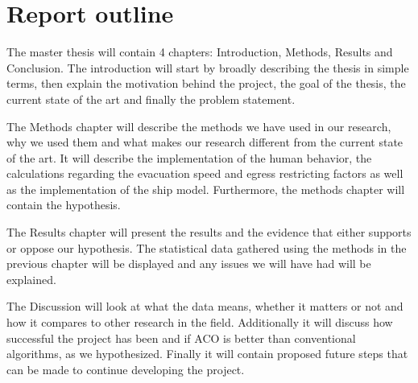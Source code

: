 \section{Report outline}

The master thesis will contain 4 chapters: Introduction, Methods, Results and Conclusion.                %
The introduction will start by broadly describing the thesis in simple terms, then explain the motivation behind the project,
the goal of the thesis, the current state of the art and finally the problem statement. 

The Methods chapter will describe the methods we have used in our research, why we used them and what makes
our research different from the current state of the art. It will describe the implementation of the human behavior,
the calculations regarding the evacuation speed and egress restricting factors as well as the implementation of the 
ship model. Furthermore, the methods chapter will contain the hypothesis.

The Results chapter will present the results and the evidence that either supports or oppose our hypothesis. The
statistical data gathered using the methods in the previous chapter will be displayed and any issues we will have had
will be explained.

The Discussion will look at what the data means, whether it matters or not and how it compares to other research in the field.
Additionally it will discuss how successful the project has been and if ACO is better than conventional algorithms, as we hypothesized.
Finally it will contain proposed future steps that can be made to continue developing the project.
